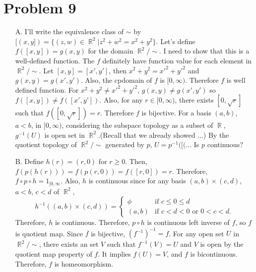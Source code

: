 \documentclass{article}
\DeclareMathOperator{\rr}{\mathbb{R}}
\begin{document}
\section*{Problem 9}
\begin{enumerate}
\item[A.] I'll write the equivalence class of $\sim$ by $[(x,y])=\{(z,w)\in \rr^2|z^2+w^2=x^2+y^2\}$. Let's define $f([x,y])=g(x,y)$ for the domain $\rr^2/\sim$. I need to show that this is a well-defined function. The $f$ definitely have function value for each element in $\rr^2/\sim$. Let $[x,y]=[x',y']$, then $x^2+y^2=x'^2+y'^2$ and $g(x,y)=g(x', y')$. Also, the cpdomain of $f$ is $[0,\infty)$. Therefore $f$ is well defined function. For $x^2+y^2\neq x'^2+y'^2$, $g(x,y)\neq g(x', y')$ so $f([x,y])\neq f([x',y'])$. Also, for any $r\in [0, \infty)$, there exists $[0, \sqrt{r}]$ such that $f([0, \sqrt{r}])=r$. Therefore $f$ is bijective. For a basis $(a,b)$, $a<b$, in $[0, \infty)$, considering the subspace topology as a subset of $\rr$, $g^{-1}(U)$ is open set in $\rr^2$.(Recall that we already showed ...) By the quotient topology of $\rr^2/\sim$ generated by $p$, $U=p^{-1}([($... Is $p$ continuous?
\item[B.] Define $h(r)=(r, 0)$ for $r\geq 0$. Then, $f(p(h(r)))=f(p(r, 0))=f([r,0])=r$. Therefore, $f\circ p \circ h=1_{[0,\infty}$. Also, $h$ is continuous since for any basis $(a,b)\times (c,d)$, $a<b$, $c<d$ of $\rr^2$,
\begin{equation*}
h^{-1}\left((a,b)\times (c,d)\right)=\begin{cases}
\phi & \text{if }c\leq 0\leq d \\
(a,b) & \text{if } c<d<0 \text{ or }0<c<d.
\end{cases}
\end{equation*}
Therefore, $h$ is continuous. Therefore, $p\circ h$ is continuous left inverse of $f$, so $f$ is quotient map. Since $f$ is bijective, $\left(f^{-1}\right)^{-1}=f$. For any open set $U$ in $\rr^2/\sim$, there exists an set $V$ such that $f^{-1}(V)=U$ and $V$ is open by the quotient map property of $f$. It implies $f(U)=V$, and $f$ is bicontinuous. Therefore, $f$ is homeomorphism.
\end{enumerate}
\end{document}
